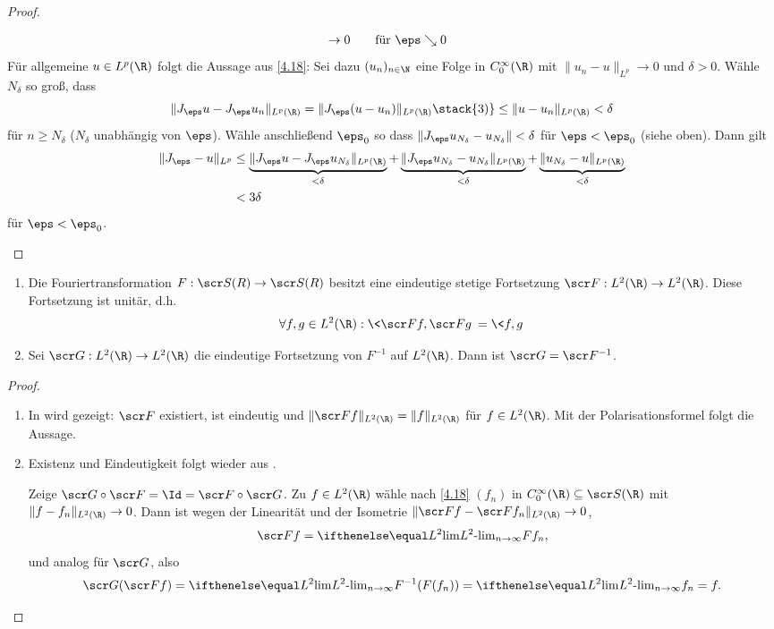 \begin{st}
\begin{proof}
\begin{enumerate}[1)]
\begin{align*}
					&\to 0 \qquad \text{für $\eps \searrow 0$}
				\end{align*}
				Für allgemeine $u \in L^p(\R)$ folgt die Aussage aus \ref{4.18}:
				Sei dazu $(u_n)_{n\in \N}$ eine Folge in $C_0^\infty(\R)$ mit $\|u_n - u\|_{L^p} \to 0$ und $\delta > 0$.
				Wähle $N_\delta$ so groß, dass
				\[
					\|J_\eps u - J_\eps u_n\|_{L^p(\R)}
					= \|J_\eps (u-u_n)\|_{L^p(\R)}
					\stack{3)}\le \|u - u_n\|_{L^p(\R)}
					< \delta
				\]
				für $n\ge N_\delta$ ($N_\delta$ unabhängig von $\eps$).
				Wähle anschließend $\eps_0$ so dass $\|J_\eps u_{N_\delta} - u_{N_\delta}\| < \delta$ für $\eps < \eps_0$ (siehe oben).
				Dann gilt
				\begin{align*}
					\|J_\eps - u\|_{L^p}
					&\le \underbrace{\|J_\eps u - J_\eps u_{N_\delta}\|_{L^p(\R)}}_{<\delta} + \underbrace{\|J_\eps u_{N_\delta} - u_{N_\delta}\|_{L^p(\R)}}_{<\delta} + \underbrace{\|u_{N_\delta} - u\|_{L^p(\R)}}_{<\delta} \\
					&< 3\delta
				\end{align*}
				für $\eps < \eps_0$.
		\end{enumerate}
	\end{proof}
\end{st}

\begin{st} \label{4.21}
	\begin{enumerate}[1)]
		\item
			Die Fouriertransformation $F: \scr S(R) \to \scr S(R)$ besitzt eine eindeutige stetige Fortsetzung $\scr F:L^2(\R) \to L^2(\R)$.
			Diese Fortsetzung ist unitär, d.h.
			\[
				\forall f,g \in L^2 (\R) : \<\scr F f, \scr Fg \> = \<f,g\>
			\]
		\item
			Sei $\scr G: L^2(\R) \to L^2(\R)$ die eindeutige Fortsetzung von $F^{-1}$ auf $L^2(\R)$.
			Dann ist $\scr G = \scr F^{-1}$.
	\end{enumerate}
	\begin{proof}
		\begin{enumerate}[1)]
			\item
				In  wird gezeigt: $\scr F$ existiert, ist eindeutig und $\|\scr Ff\|_{L^2(\R)} = \|f\|_{L^2(\R)}$ für $f \in L^2(\R)$.
				Mit der Polarisationsformel folgt die Aussage.
			\item
				Existenz und Eindeutigkeit folgt wieder aus .

				Zeige $\scr G \circ \scr F = \Id = \scr F \circ \scr G$.
				Zu $f \in L^2(\R)$ wähle nach \ref{4.18} $(f_n)$ in $C_0^\infty(\R) \subset \scr S(\R)$ mit $\|f-f_n\|_{L^2(\R)} \to 0$.
				Dann ist wegen der Linearität und der Isometrie $\|\scr F f  - \scr F f_n\|_{L^2(\R)}\to 0$,
				\[
					\scr F f = \lim[L^2]_{n\to \infty} F f_n,
				\]
				und analog für $\scr G$, also
				\[
				   \scr G(\scr F f) = \lim[L^2]_{n\to\infty} F^{-1}(F(f_n)) = \lim[L^2]_{n\to\infty} f_n = f.
				\]
		\end{enumerate}
	\end{proof}
\end{st}

